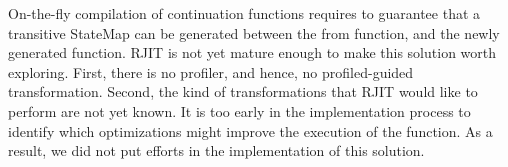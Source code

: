 On-the-fly compilation of continuation functions requires to guarantee that a transitive StateMap can be generated between the from function, and the newly generated function.
RJIT is not yet mature enough to make this solution worth exploring.
First, there is no profiler, and hence, no profiled-guided transformation. 
Second, the kind of transformations that RJIT would like to perform are not yet known. 
It is too early in the implementation process to identify which optimizations might improve the execution of the function.
As a result, we did not put efforts in the implementation of this solution.\\

